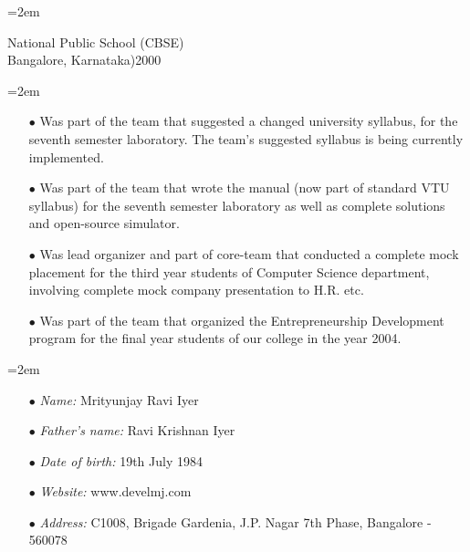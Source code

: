 \documentclass{scrartcl}	%
\newcommand{\MarginDate}[1]{\marginpar{\raggedleft\itshape\small#1}}
\newcommand{\Description}[1]{\hangindent=2em\hangafter=0\noindent\raggedright\footnotesize{#1}\par\normalsize}
\begin{document}
\begin{cv}{
}
\vspace{1em}

\Description{National Public School (CBSE)\MarginDate{Standard 10}\\Bangalore, Karnataka)\hfill{2000}
}

\vspace{1.5em}

\noindent{}
\vspace{0.5em}

\Description{
\begin{itemize}
  \item[\footnotesize$\bullet$] Was part of the team that suggested a changed university syllabus, for the seventh semester laboratory. The team's suggested syllabus is being currently implemented.
  \item[\footnotesize$\bullet$] Was part of the team that wrote the manual (now part of
  standard VTU syllabus) for the seventh
  semester laboratory as well as complete solutions and open-source
  simulator.
  \item[\footnotesize$\bullet$] Was lead organizer and part of core-team that conducted a complete mock placement for the third year students of Computer Science department, involving complete mock company presentation to H.R. etc.
  \item[\footnotesize$\bullet$] Was part of the team that organized
    the Entrepreneurship Development program for the final year
    students of our college in the year 2004.
\end{itemize}
}

\vspace{1.5em}

\noindent{}
\vspace{0.5em}

\Description{
\begin{itemize}
  \item[\footnotesize$\bullet$] \textsl{Name:} Mrityunjay Ravi Iyer
  \item[\footnotesize$\bullet$] \textsl{Father's name:} Ravi Krishnan Iyer
  \item[\footnotesize$\bullet$] \textsl{Date of birth:} 19th July 1984
  \item[\footnotesize$\bullet$] \textsl{Website:} www.develmj.com
  \item[\footnotesize$\bullet$] \textsl{Address:} C1008, Brigade
    Gardenia, J.P. Nagar 7th Phase, Bangalore - 560078
\end{itemize}
}
\end{cv}
\end{document}
